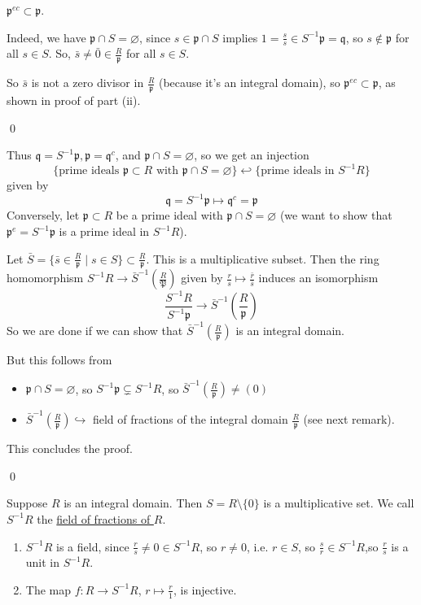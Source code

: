 \documentclass[x11names,reqno,14pt]{extarticle}
\newcommand{\mk}[1]{\mathfrak{#1}}
\begin{document}
\begin{enumerate}[label=(\roman*)]
\claim 

$\mk{p}^{ec} \subset \mk{p}$. 

\proof

Indeed, we have $\mk{p} \cap S = \varnothing$, since $s \in \mk{p} \cap S$ implies $1 = \frac{s}{s} \in S^{-1}\mk{p} = \mk{q}$, so $s\not\in\mk{p}$ for all $s \in S$. So, $\bar{s}\neq\bar{0}\in\frac{R}{\mk{p}}$ for all $s \in S$. 

So $\bar{s}$ is not a zero divisor in $\frac{R}{\mk{p}}$ (because it's an integral domain), so $\mk{p}^{ec} \subset \mk{p}$, as shown in proof of part (ii). 

\qed

Thus $\mk{q} = S^{-1}\mk{p}, \mk{p} = \mk{q}^c$, and $\mk{p} \cap S = \varnothing$, so we get an injection 
\[
\{\text{prime ideals }\mk{p}\subset R\text{ with }\mk{p} \cap S = \varnothing\} \hookleftarrow \{\text{prime ideals in }S^{-1}R \}
\]
given by 
\[
\mk{q} = S^{-1}\mk{p} \mapsto \mk{q}^c = \mk{p}
\]
Conversely, let $\mk{p} \subset R$ be a prime ideal with $\mk{p} \cap S = \varnothing$ (we want to show that $\mk{p}^e = S^{-1}\mk{p}$ is a prime ideal in $S^{-1}R$). 

Let $\bar{S} = \{\bar{s}\in\frac{R}{\mk{p}} \mid s \in S\} \subset \frac{R}{\mk{p}}$. This is a multiplicative subset. Then the ring homomorphism $S^{-1}R\to \bar{S}^{-1}(\frac{R}{\mk{P}})$ given by $\frac{r}{s} \mapsto \frac{\bar{r}}{\bar{s}}$ induces an isomorphism
\[
\frac{S^{-1}R}{S^{-1}\mk{p}} \to \bar{S}^{-1}(\frac{R}{\mk{p}})
\]
So we are done if we can show that $\bar{S}^{-1}(\frac{R}{\mk{p}})$ is an integral domain. 

But this follows from

\begin{itemize}

\item $\mk{p} \cap S = \varnothing$, so $S^{-1}\mk{p}\subsetneq S^{-1}R$, so $\bar{S}^{-1}(\frac{R}{\mk{p}})\neq(0)$

\item $\bar{S}^{-1}(\frac{R}{\mk{p}})\hookrightarrow$ field of fractions of the integral domain $\frac{R}{\mk{p}}$ (see next remark). 

\end{itemize}

This concludes the proof.

\end{enumerate}

\qed

\rem

Suppose $R$ is an integral domain. Then $S = R\setminus\{0\}$ is a multiplicative set. We call $S^{-1}R$ the \underline{field of fractions of $R$}. 

\begin{enumerate}

\item $S^{-1}R$ is a field, since $\frac{r}{s}\neq0 \in S^{-1}R$, so $r\neq0$, i.e. $r \in S$, so $\frac{s}{r} \in S^{-1}R$,so $\frac{r}{s}$ is a unit in $S^{-1}R$. 

\item The map $f:R\to S^{-1}R$, $r \mapsto \frac{r}{1}$, is injective. 

\end{enumerate}
\end{document}
